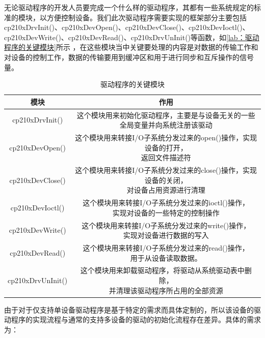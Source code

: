 	无论驱动程序的开发人员要完成一个什么样的驱动程序，其都有一些系统规定的标准的模块，以方便控制设备。我们此次驱动程序需要实现的框架部分主要包括cp210xDrvInit()、cp210xDevOpen()、cp210xDevClose()、cp210xDevIoctl()、cp210xDevWrite()、cp210xDevRead()、cp210xDrvUnInit()等函数，如\autoref{lab：驱动程序的关键模块}所示 ，在这些模块当中关键要处理的内容是对数据的传输工作和对设备的控制工作，数据的传输要用到缓冲区和用于进行同步和互斥操作的信号量。
\begin{table}[!h]
\centering
\begin{tabular}{|c|c|}
\hline
{模块} & {作用} \\
\hline
{cp210xDrvInit()} & \tabincell{c}{这个模块用来初始化驱动程序，主要是与设备无关的一些\\全局变量并向系统注册该驱动} \\
\hline
{cp210xDevOpen()} & \tabincell{c}{这个模块用来转接I/O子系统分发过来的open()操作，实现设备的打开，\\返回文件描述符} \\
\hline
{cp210xDevClose()} & \tabincell{c}{这个模块用来转接I/O子系统分发过来的close()操作，实现设备的关闭，\\对设备占用资源进行清理} \\
\hline
{cp210xDevIoctl()} & \tabincell{c}{这个模块用来转接I/O子系统分发过来的ioctl()操作，\\实现对设备的一些特定的控制操作} \\
\hline
{cp210xDevWrite()} & \tabincell{c}{这个模块用来转接I/O子系统分发过来的write()操作，\\实现对设备进行数据的写入} \\
\hline
{cp210xDevRead()} & \tabincell{c}{这个模块用来转接I/O子系统分发过来的read()操作，\\用于从设备读取数据。} \\
\hline
{cp210xDrvUnInit()} & \tabincell{c}{这个模块用来卸载驱动程序，将驱动从系统驱动表中删除，\\并清理该驱动程序所占用的全部资源} \\
\hline
\end{tabular} 
\caption{驱动程序的关键模块}\label{lab：驱动程序的关键模块}
\end{table}


	由于对于仅支持单设备驱动程序是基于特定的需求而具体定制的，所以该设备的驱动程序的实现流程与通常的支持多设备的驱动的初始化流程存在差异。具体的需求为：\\
\\


